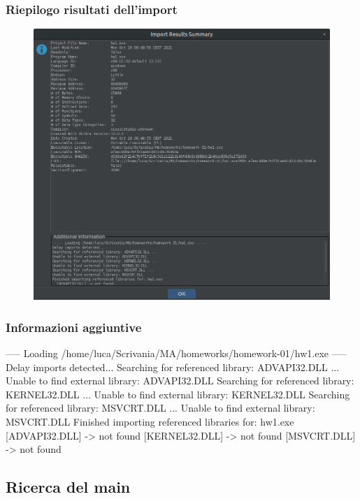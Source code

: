 \documentclass[a4paper, 12pt]{article}
\begin{document}
\subsubsection{Riepilogo risultati dell'import}
\begin{figure}[H]
\centering\includegraphics[width=\textwidth]{Import_Results_Summary}
\end{figure}

\subsubsection{Informazioni aggiuntive}
\begin{spverbatim}

----- Loading /home/luca/Scrivania/MA/homeworks/homework-01/hw1.exe ----- 
Delay imports detected... 
Searching for referenced library: ADVAPI32.DLL ... 
Unable to find external library: ADVAPI32.DLL 
Searching for referenced library: KERNEL32.DLL ... 
Unable to find external library: KERNEL32.DLL 
Searching for referenced library: MSVCRT.DLL ... 
Unable to find external library: MSVCRT.DLL 
Finished importing referenced libraries for: hw1.exe 
  [ADVAPI32.DLL] -> not found 
  [KERNEL32.DLL] -> not found 
  [MSVCRT.DLL] -> not found 
\end{spverbatim}

\newpage
\subsection{Ricerca del main}
\end{document}

